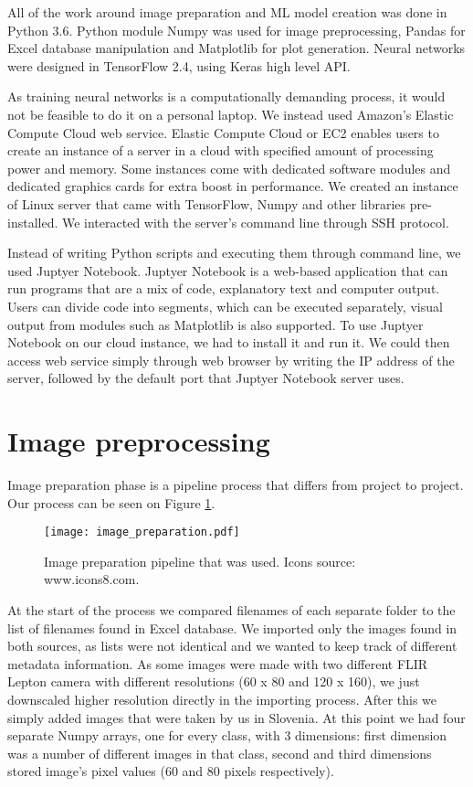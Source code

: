 All of the work around image preparation and ML model creation was done in Python 3.6.
Python module Numpy was used for image preprocessing, Pandas for Excel database manipulation and Matplotlib for plot generation.
Neural networks were designed in TensorFlow 2.4, using Keras high level API.

As training neural networks is a computationally demanding process, it would not be feasible to do it on a personal laptop.
We instead used Amazon's Elastic Compute Cloud web service.
Elastic Compute Cloud or EC2 enables users to create an instance of a server in a cloud with specified amount of processing power and memory.
Some instances come with dedicated software modules and dedicated graphics cards for extra boost in performance.
We created an instance of Linux server that came with TensorFlow, Numpy and other libraries pre-installed.
We interacted with the server's command line through SSH protocol.

Instead of writing Python scripts and executing them through command line, we used Juptyer Notebook. 
Juptyer Notebook is a web-based application that can run programs that are a mix of code, explanatory text and computer output.
Users can divide code into segments, which can be executed separately, visual output from modules such as Matplotlib is also supported.
To use Juptyer Notebook on our cloud instance, we had to install it and run it.
We could then access web service simply through web browser by writing the IP address of the server, followed by the default port that Juptyer Notebook server uses.


\section{ Image preprocessing}

Image preparation phase is a pipeline process that differs from project to project.
Our process can be seen on Figure \ref{image_preparation}.

\begin{figure}[ht]
    \centering
    \texttt{[image: image\_preparation.pdf]} 
    \caption{Image preparation pipeline that was used. Icons source: www.icons8.com.}
    \label{image_preparation}
\end{figure}

At the start of the process we compared filenames of each separate folder to the list of filenames found in Excel database.
We imported only the images found in both sources, as lists were not identical and we wanted to keep track of different metadata information.
As some images were made with two different FLIR Lepton camera with different resolutions (60 x 80 and 120 x 160), we just downscaled higher resolution directly in the importing process.
After this we simply added images that were taken by us in Slovenia.
At this point we had four separate Numpy arrays, one for every class, with 3 dimensions: first dimension was a number of different images in that class, second and third dimensions stored image's pixel values (60 and 80 pixels respectively).

